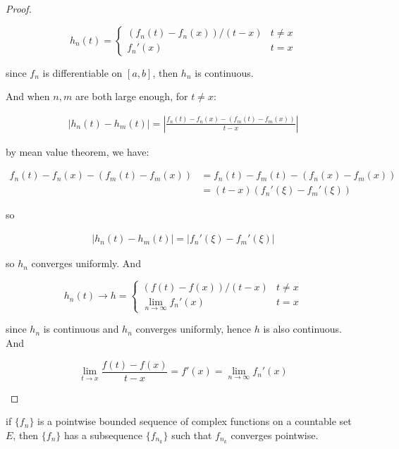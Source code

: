 \begin{proof}
\begin{enumerate}
        \[
            h_n(t) = \begin{cases}
                (f_n(t) - f_n(x)) / (t- x) & t \ne x \\
                f_n'(x) & t = x
            \end{cases}
        \]

        since $f_n$ is differentiable on $[a,b]$, then $h_n$ is continuous.

        And when $n,m$ are both large enough, for $t \ne x$:

        \begin{align*}
            \left|h_n(t) - h_m(t) \right| =  \left|  \frac{f_n(t) - f_n(x) - \left( f_m(t) - f_m(x) \right)}{t-x}\right|
        \end{align*}

        by mean value theorem, we have:

        \begin{align*}
            f_n(t) - f_n(x) - \left( f_m(t) - f_m(x) \right) &= f_n(t) - f_m(t) - \left( f_n(x) - f_m(x) \right) \\
            &= (t-x)\left( f_n'(\xi) - f_m'(\xi) \right)
        \end{align*}

        so

        \begin{align*}
            \left|h_n(t) - h_m(t) \right| = \left| f_n'(\xi) - f_m'(\xi) \right|
        \end{align*}

        so $h_n$ converges uniformly. And

        \[
            h_n(t) \to h = \begin{cases}
                (f(t) - f(x))/(t-x) & t \ne x \\
                \lim_{n \to \infty} f_n'(x) & t = x
            \end{cases}
        \]

        since $h_n$ is continuous and $h_n$ converges uniformly, hence $h$ is also continuous. And

        \[
            \lim_{t \to x}\frac{f(t) - f(x)}{t-x} = f'(x) = \lim_{n \to \infty} f_n'(x)
        \]
    \end{enumerate}
\end{proof}

\begin{thm}
    \label{thm:pointwise-bounded-on-countable-has-subsequence}
    if $\{ f_n \}$ is a pointwise bounded sequence of complex functions
    on a countable set $E$, then $\{f_n\}$ has a subsequence $\{ f_{n_k} \}$ 
    such that $f_{n_k}$ converges pointwise.
\end{thm}

